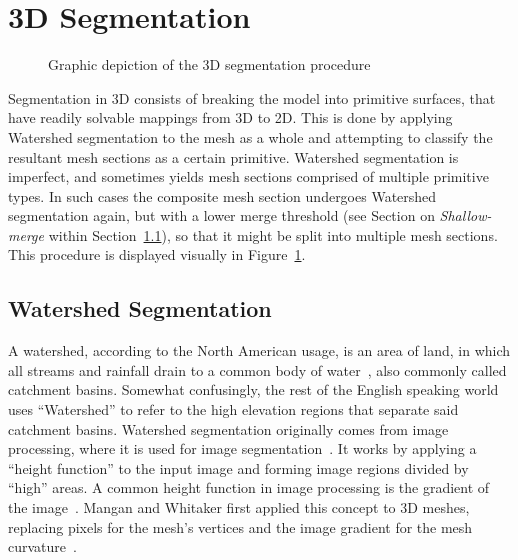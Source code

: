 \section{3D Segmentation}
\begin{figure}[ht]
	\centering
{}
	\caption{Graphic depiction of the 3D segmentation procedure}
	\label{fig:Seg3D}
\end{figure}
Segmentation in 3D consists of breaking the model into primitive surfaces, that have readily solvable mappings from 3D to 2D.
This is done by applying Watershed segmentation to the mesh as a whole and attempting to classify the resultant mesh sections as a certain primitive.
Watershed segmentation is imperfect, and sometimes yields mesh sections comprised of multiple primitive types.
In such cases the composite mesh section undergoes Watershed segmentation again, but with a lower merge threshold (see Section on \textit{Shallow-merge} within Section~\ref{sec:ws_seg}), so that it might be split into multiple mesh sections.
This procedure is displayed visually in Figure~\ref{fig:Seg3D}.

\subsection{Watershed Segmentation}\label{sec:ws_seg}
A watershed, according to the North American usage, is an area of land, in which all streams and rainfall drain to a common body of water~\cite{USGS_Watersheds}, also commonly called catchment basins.
Somewhat confusingly, the rest of the English speaking world uses ``Watershed'' to refer to the high elevation regions that separate said catchment basins.
Watershed segmentation originally comes from image processing, where it is used for image segmentation~\cite{ImageSegWS, DigitalImageProc}.
It works by applying a ``height function'' to the input image and forming image regions divided by ``high'' areas.
A common height function in image processing is the gradient of the image~\cite{ImageSegWS}.
Mangan and Whitaker first applied this concept to 3D meshes, replacing pixels for the mesh's vertices and the image gradient for the mesh curvature~\cite{Watershed}.

